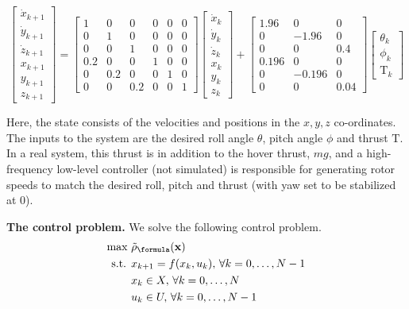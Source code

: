 {\tiny
\begin{equation}
\label{eq:quad_dyn}
\begin{bmatrix} \dot{x}_{k+1} \\ \dot{y}_{k+1} \\ \dot{z}_{k+1} \\ x_{k+1} \\ y_{k+1} \\ z_{k+1} \end{bmatrix}= \begin{bmatrix} 1&0&0&0&0&0 \\0&1&0&0&0&0 \\0&0&1&0&0&0 \\0.2&0&0&1&0&0 \\0&0.2&0&0&1&0 \\0&0&0.2&0&0&1\end{bmatrix} \begin{bmatrix} \dot{x}_{k} \\ \dot{y}_{k} \\ \dot{z}_{k} \\ x_{k} \\ y_{k} \\ z_{k} \end{bmatrix} + \begin{bmatrix} 1.96&0&0 \\ 0&-1.96&0 \\0&0&0.4 \\0.196&0&0 \\0&-0.196&0\\0&0&0.04 \end{bmatrix} \begin{bmatrix} \theta_k \\ \phi_k \\ \text{T}_k \end{bmatrix}
\end{equation}
}

Here, the state consists of the velocities and positions in the $x,y,z$ co-ordinates. 
The inputs to the system are the desired roll angle $\theta$, pitch angle $\phi$ and thrust $\text{T}$. 
In a real system, this thrust is in addition to the hover thrust, $mg$, and a high-frequency low-level controller (not simulated) is responsible for generating rotor speeds to match the desired roll, pitch and thrust (with yaw set to be stabilized at $0$). 

\textbf{The control problem.}
We solve the following control problem.
\begin{subequations}
\label{eq:atc_ctrl}
\begin{align}
\text{max } & \srob_{\formula}(\sstraj) \\ %
\text{s.t. } & x_{k+1} = f(x_k,u_k), \, \forall k=0,\dotsc,N-1 \\
 & x_k \in X, \, \forall k=0,\dotsc,N \\
 & u_k \in U, \, \forall k=0,\dotsc,N-1 
\end{align}
\end{subequations}

